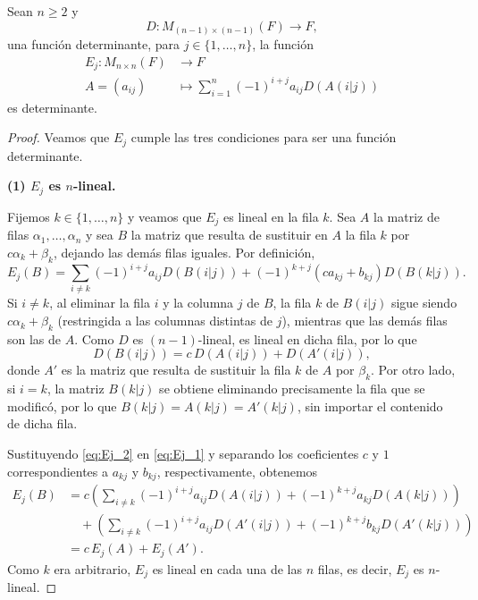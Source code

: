 \documentclass[12pt,a4paper]{book}
\newcommand{\llaves}[1]{\{#1\}}
\newcommand{\parentesis}[1]{\left(#1\right)}
\begin{document}
    \begin{teorema}
    \label{teo:12}
        Sean $n \geq 2$ y 
        \begin{equation*}
        D: M_{(n - 1) \times (n - 1)}(F) \longrightarrow F,
        \end{equation*}
        una función determinante, para $j \in \llaves{1, \dots, n}$, la función
        \begin{align*}
            E_{j}: M_{n \times n}(F) & \longrightarrow F\\
            A = (a_{ij}) & \longmapsto \sum_{i = 1}^{n}(-1)^{i + j}a_{ij}D(A(i|j))
        \end{align*}
        es determinante.
    \end{teorema}

    \begin{proof}
        Veamos que $E_{j}$ cumple las tres condiciones para ser una función determinante.

        \textbf{(1) $E_{j}$ es $n$-lineal.}

        Fijemos $k \in \llaves{1, \dots, n}$ y veamos que $E_{j}$ es lineal en la fila $k$. Sea $A$ la matriz de filas $\alpha_{1}, \dots, \alpha_{n}$ y sea $B$ la matriz que resulta de sustituir en $A$ la fila $k$ por $c\alpha_{k} + \beta_{k}$, dejando las demás filas iguales. Por definición,
        \begin{equation}
            E_{j}(B) = \sum_{i \neq k} (-1)^{i+j} a_{ij} D(B(i|j)) + (-1)^{k+j}(ca_{kj} + b_{kj}) D(B(k|j)).
            \label{eq:Ej_1}
        \end{equation}
        Si $i \neq k$, al eliminar la fila $i$ y la columna $j$ de $B$, la fila $k$ de $B(i|j)$ sigue siendo $c\alpha_{k} + \beta_{k}$ (restringida a las columnas distintas de $j$), mientras que las demás filas son las de $A$. Como $D$ es $(n-1)$-lineal, es lineal en dicha fila, por lo que
        \begin{equation}
            D(B(i|j)) = c \, D(A(i|j)) + D(A'(i|j)),
            \label{eq:Ej_2}
        \end{equation}
        donde $A'$ es la matriz que resulta de sustituir la fila $k$ de $A$ por $\beta_{k}$. Por otro lado, si $i = k$, la matriz $B(k|j)$ se obtiene eliminando precisamente la fila que se modificó, por lo que $B(k|j) = A(k|j) = A'(k|j)$, sin importar el contenido de dicha fila.

        Sustituyendo \eqref{eq:Ej_2} en \eqref{eq:Ej_1} y separando los coeficientes $c$ y $1$ correspondientes a $a_{kj}$ y $b_{kj}$, respectivamente, obtenemos
        \begin{align*}
            E_{j}(B) & = c \parentesis{\sum_{i \neq k} (-1)^{i+j} a_{ij} D(A(i|j)) + (-1)^{k+j} a_{kj} D(A(k|j))} \\
            & \quad + \parentesis{\sum_{i \neq k} (-1)^{i+j} a_{ij} D(A'(i|j)) + (-1)^{k+j} b_{kj} D(A'(k|j))} \\
            & = c \, E_{j}(A) + E_{j}(A').
        \end{align*}
        Como $k$ era arbitrario, $E_{j}$ es lineal en cada una de las $n$ filas, es decir, $E_{j}$ es $n$-lineal.


\end{proof}
\end{document}
